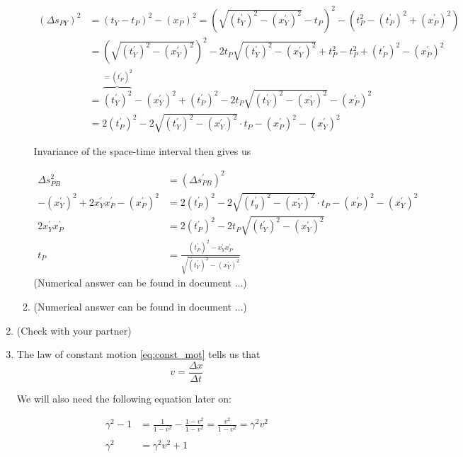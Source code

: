 \documentclass[a4paper,10pt,english]{article}
\begin{document}
\begin{enumerate}
\begin{enumerate}
\begin{align*}
(\Delta s_{PY})^2&=(t_{Y}-t_{P})^2-(x_{P})^2=\left(\sqrt{(t_{Y}^{\prime})^2-(x_{Y}^{\prime})^2}-t_{P}\right)^2-\left(t_{P}^{2}-(t_{P}^{\prime})^{2}+(x_{P}^{\prime})^{2}\right)\\
&=\left(\sqrt{(t_{Y}^{\prime})^2-(x_{Y}^{\prime})^2}\right)^2-2t_{P}\sqrt{(t_{Y}^{\prime})^2-(x_{Y}^{\prime})^2}+t_{P}^2-t_{P}^{2}+(t_{P}^{\prime})^{2}-(x_{P}^{\prime})^{2}\\
&=\overbrace{(t_{Y}^{\prime})^2}^{=(t_{P}^{\prime})^2}-(x_{Y}^{\prime})^2+(t_{P}^{\prime})^{2}-2t_{P}\sqrt{(t_{Y}^{\prime})^2-(x_{Y}^{\prime})^2}-(x_{P}^{\prime})^{2}\\
&=2(t_{P}^{\prime})^{2}-2\sqrt{(t_{Y}^{\prime})^2-(x_{Y}^{\prime})^2}\cdot t_{P}-(x_{P}^{\prime})^{2}-(x_{Y}^{\prime})^2
\end{align*}

Invariance of the space-time interval then gives us

\begin{align}
\Delta s_{PB}^2&=(\Delta s_{PB}^{\prime})^2 \nonumber\\
-(x_{Y}^{\prime})^2+2x_{Y}^{\prime}x_{P}^{\prime}-(x_{P}^{\prime})^2&=2(t_{P}^{\prime})^{2}-2\sqrt{(t_{y}^{\prime})^2-(x_{Y}^{\prime})^2}\cdot t_{P}-(x_{P}^{\prime})^{2}-(x_{Y}^{\prime})^2 \nonumber\\
2x_{Y}^{\prime}x_{P}^{\prime}&=2(t_{P}^{\prime})^{2}-2t_{P}\sqrt{(t_{Y}^{\prime})^2-(x_{Y}^{\prime})^2} \nonumber\\
t_{P}&=\frac{(t_{P}^{\prime})^{2}-x_{Y}^{\prime}x_{P}^{\prime}}{\sqrt{(t_{Y}^{\prime})^2-(x_{Y}^{\prime})^2}} \label{eq:t_p}
\end{align}
(Numerical answer can be found in document $\ldots$)


\item (Numerical answer can be found in document $\ldots$)
\end{enumerate}

\item (Check with your partner)

\item The law of constant motion \ref{eq:const_mot} tells us that \begin{equation*}v=\frac{\Delta x}{\Delta t}\end{equation*}

We will also need the following equation later on:

\begin{align}
\gamma^{2}-1&=\frac{1}{1-v^{2}}-\frac{1-v^{2}}{1-v^{2}}=\frac{v^{2}}{1-v^{2}}=\gamma^{2}v^{2} \nonumber\\ \nonumber\\
\gamma^{2}&=\gamma^{2}v^{2}+1 \label{eq:gamma_trans}
\end{align}


\end{enumerate}
\end{document}
